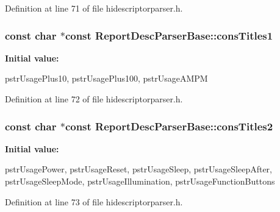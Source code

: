 \-Definition at line 71 of file hidescriptorparser.\-h.

\hypertarget{class_report_desc_parser_base_a4997a30230193326b84fb8f3d3d30536}{
\subsubsection[{cons\-Titles1}]{\setlength{\rightskip}{0pt plus 5cm}const char $\ast$const {\bf \-Report\-Desc\-Parser\-Base\-::cons\-Titles1}}}\label{class_report_desc_parser_base_a4997a30230193326b84fb8f3d3d30536}
{\bfseries \-Initial value\-:}
\begin{DoxyCode}
 {
        pstrUsagePlus10,
        pstrUsagePlus100,
        pstrUsageAMPM
}
\end{DoxyCode}


\-Definition at line 72 of file hidescriptorparser.\-h.

\hypertarget{class_report_desc_parser_base_a7b760abbe1a67f241a9c6d34da9207f4}{
\subsubsection[{cons\-Titles2}]{\setlength{\rightskip}{0pt plus 5cm}const char $\ast$const {\bf \-Report\-Desc\-Parser\-Base\-::cons\-Titles2}}}\label{class_report_desc_parser_base_a7b760abbe1a67f241a9c6d34da9207f4}
{\bfseries \-Initial value\-:}
\begin{DoxyCode}
 {
        pstrUsagePower,
        pstrUsageReset,
        pstrUsageSleep,
        pstrUsageSleepAfter,
        pstrUsageSleepMode,
        pstrUsageIllumination,
        pstrUsageFunctionButtons

}
\end{DoxyCode}


\-Definition at line 73 of file hidescriptorparser.\-h.

